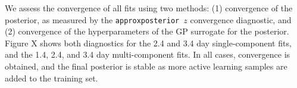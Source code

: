 \documentclass[twocolumn, twocolappendix]{aastex63}
\def\approxposterior{\texttt{approxposterior}}
\begin{document}
We assess the convergence of all fits using two methods: (1) convergence of the posterior, as measured by the \approxposterior~$z$ convergence diagnostic, and (2) convergence of the hyperparameters of the GP surrogate for the posterior. Figure X shows both diagnostics for the 2.4 and 3.4 day single-component fits, and the 1.4, 2.4, and 3.4 day multi-component fits. In all cases, convergence is obtained, and the final posterior is stable as more active learning samples are added to the training set.




\end{document}
